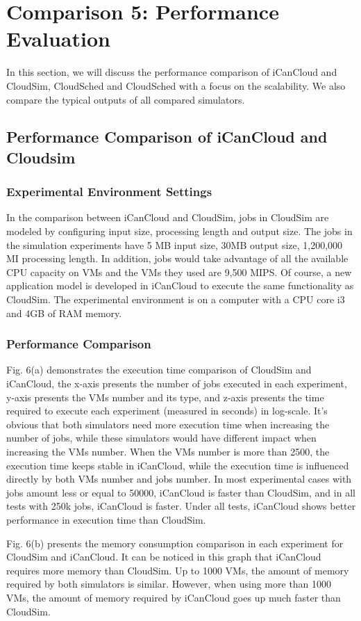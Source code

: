 \documentclass[3p, twocolumn]{elsarticle}
\begin{document}
\section{Comparison 5: Performance Evaluation}
In this section, we will discuss the performance comparison of iCanCloud and CloudSim, CloudSched and CloudSched with a focus on the scalability. We also compare the typical outputs of all compared simulators.
\subsection{Performance Comparison of iCanCloud and Cloudsim}
\subsubsection{Experimental Environment Settings}
In the comparison between iCanCloud and CloudSim, jobs in CloudSim are modeled by configuring input size, processing length and output size. The jobs in the simulation experiments have 5 MB input size, 30MB output size, 1,200,000 MI processing length. In addition, jobs would take advantage of all the available CPU capacity on VMs and the VMs they used are 9,500 MIPS. Of course, a new application model is developed in iCanCloud to execute the same functionality as CloudSim. The experimental environment is on a computer with a CPU core i3 and 4GB of RAM memory.
\subsubsection{Performance Comparison}
Fig. 6(a) demonstrates the execution time comparison of CloudSim and iCanCloud, the x-axis presents the number of jobs executed in each experiment, y-axis presents the VMs number and its type, and z-axis presents the time required to execute each experiment (measured in seconds) in log-scale. It's obvious that both simulators need more execution time when increasing the number of jobs, while these simulators would have different impact when increasing the VMs number. When the VMs number is more than 2500, the execution time keeps stable in iCanCloud, while the execution time is influenced directly by both VMs number and jobs number. In most experimental cases with jobs amount less or equal to 50000, iCanCloud is faster than CloudSim, and in all tests with 250k jobs, iCanCloud is faster. Under all tests, iCanCloud shows better performance in execution time than CloudSim.

Fig. 6(b) presents the memory consumption comparison in each experiment for CloudSim and iCanCloud. It can be noticed in this graph that iCanCloud requires more memory than CloudSim. Up to 1000 VMs, the amount of memory required by both simulators is similar. However, when using more than 1000 VMs, the amount of memory required by iCanCloud goes up much faster than CloudSim.
\end{document}
